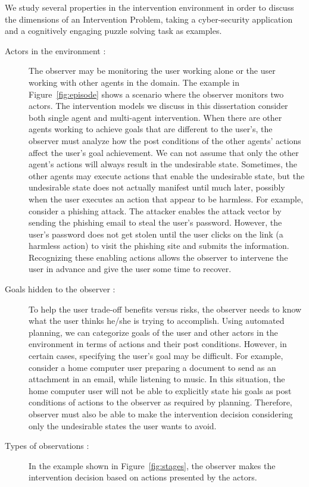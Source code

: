 We study several properties in the intervention environment in order to discuss the dimensions of an Intervention Problem, taking a cyber-security application and a cognitively engaging puzzle solving task as examples.
\begin{description}
\item [Actors in the environment :] The observer may be monitoring the user working alone or the user working with other agents in the domain. 
The example in Figure~\ref{fig:episode} shows a scenario where the observer monitors two actors. 
The intervention models we discuss in this dissertation consider both single agent and multi-agent intervention.
When there are other agents working to achieve goals that are different to the user's, the observer must  analyze how the post conditions of the other agents' actions affect the user's goal achievement. 
We can not assume that only the other agent's actions will always result in the undesirable state.
Sometimes, the other agents may execute actions that enable the undesirable state, but the undesirable state does not actually manifest until much later, possibly when the user executes an action that appear to be harmless. 
For example, consider a phishing attack. 
The attacker enables the attack vector by sending the phishing email to steal the user's password. However, the user's password does not get stolen until the user clicks on the link (a  harmless action) to visit the phishing site and submits the information.
Recognizing these enabling actions allows the observer to intervene the user in advance and give the user some time to recover.
\item [Goals hidden to the observer :] To help the user trade-off benefits versus risks, the observer needs to know what the user thinks he/she is trying to accomplish.  
Using automated planning, we can categorize goals of the user and other actors in the environment in terms of  actions and their post conditions. 
However, in certain cases, specifying the user's goal may be difficult. 
For example, consider a home computer user preparing a document to send as an attachment in an email, while listening to music. In this situation, the home computer user will not be able to explicitly state his goals as post conditions of actions to the observer as required by planning.
Therefore, observer must also be able to make the intervention decision considering only the undesirable states the user wants to avoid.
\item [Types of observations :] In the example shown in Figure~\ref{fig:stages}, the observer makes the intervention decision based on actions presented by the actors. 

\end{description}
